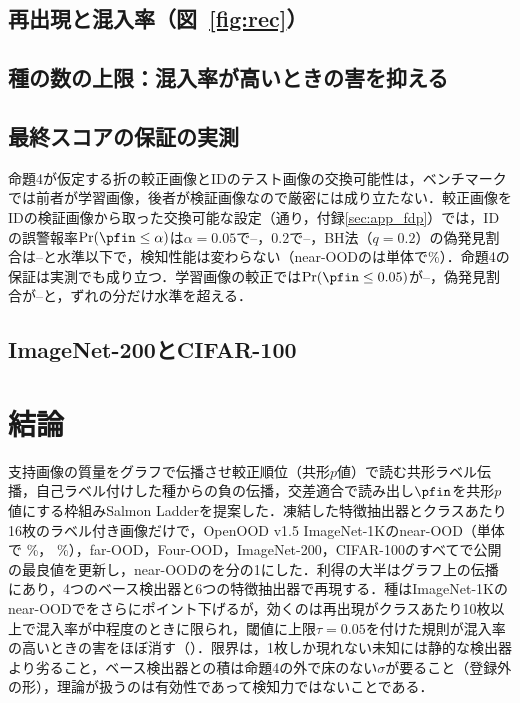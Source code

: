 \subsection{再出現と混入率（図~\ref{fig:rec}）}
\label{sec:rec}


\subsection{種の数の上限：混入率が高いときの害を抑える}
\label{sec:cap}


\subsection{最終スコアの保証の実測}
\label{sec:fdp}
命題4が仮定する折の較正画像とIDのテスト画像の交換可能性は，ベンチマークでは前者が学習画像，後者が検証画像なので厳密には成り立たない．較正画像をIDの検証画像から取った交換可能な設定（\NVcalNSplits{}通り，付録\ref{sec:app_fdp}）では，IDの誤警報率$\Pr(\pfin\le\alpha)$は$\alpha{=}0.05$で\NVcalFprZeroZeroFiveMin{}--\NVcalFprZeroZeroFiveMax{}，$0.2$で\NVcalFprZeroTwoMin{}--\NVcalFprZeroTwoMax{}，BH法（$q{=}0.2$）の偽発見割合は\NVcalBhFdpMin{}--\NVcalBhFdpMax{}と水準以下で，検知性能は変わらない（near-OODの\FPR{}は単体で\NVcalAloneNearFpr\%）．命題4の保証は実測でも成り立つ．学習画像の較正では$\Pr(\pfin\le0.05)$が\NVtrainFprZeroZeroFiveMin{}--\NVtrainFprZeroZeroFiveMax{}，偽発見割合が\NVtrainBhFdpMin{}--\NVtrainBhFdpMax{}と，ずれの分だけ水準を超える．

\subsection{ImageNet-200とCIFAR-100}
\label{sec:in200}


\section{結論}
支持画像の質量をグラフで伝播させ較正順位（共形$p$値）で読む共形ラベル伝播，自己ラベル付けした種からの負の伝播，交差適合で読み出し$\pfin$を共形$p$値にする枠組みSalmon Ladderを提案した．凍結した特徴抽出器とクラスあたり16枚のラベル付き画像だけで，OpenOOD v1.5 ImageNet-1Kのnear-OOD（単体で\AUC{} \NAloneNearAuroc\%，\FPR{} \NAloneNearFpr\%），far-OOD，Four-OOD，ImageNet-200，CIFAR-100のすべてで公開の最良値を更新し，near-OODの\FPR{}を\NAloneNearFprRatioVsBestOther{}分の1にした．利得の大半はグラフ上の伝播にあり，4つのベース検出器と6つの特徴抽出器で再現する．種はImageNet-1Kのnear-OODで\FPR{}をさらに\NAloneNearDfprVsLpAbs{}ポイント下げるが，効くのは再出現がクラスあたり10枚以上で混入率が中程度のときに限られ，閾値に上限$\tau{=}0.05$を付けた規則が混入率の高いときの害をほぼ消す（）．限界は，1枚しか現れない未知には静的な検出器より劣ること，ベース検出器との積は命題4の外で床のない$\sigma$が要ること（登録外の形），理論が扱うのは有効性であって検知力ではないことである．


{\makeatletter{} \makeatother}

\clearpage
\appendix


